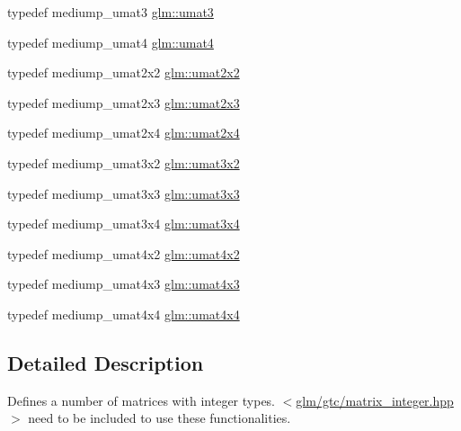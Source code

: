 \begin{DoxyCompactItemize}
\item 
typedef mediump\-\_\-umat3 \hyperlink{group__gtc__matrix__integer_ga8b8fbc858e28abf8fc344744f8d6d368}{glm\-::umat3}
\item 
typedef mediump\-\_\-umat4 \hyperlink{group__gtc__matrix__integer_ga7ae562000d8a8d193e9f93cf51e2e113}{glm\-::umat4}
\item 
typedef mediump\-\_\-umat2x2 \hyperlink{group__gtc__matrix__integer_gad3c997b31dd69bdb4787867e758ed48d}{glm\-::umat2x2}
\item 
typedef mediump\-\_\-umat2x3 \hyperlink{group__gtc__matrix__integer_ga890ae28f9230794138b2c89f44ce3376}{glm\-::umat2x3}
\item 
typedef mediump\-\_\-umat2x4 \hyperlink{group__gtc__matrix__integer_ga3b23b164240cf4dfb429776da7be9d88}{glm\-::umat2x4}
\item 
typedef mediump\-\_\-umat3x2 \hyperlink{group__gtc__matrix__integer_ga257300f2710612877ef45438a366e308}{glm\-::umat3x2}
\item 
typedef mediump\-\_\-umat3x3 \hyperlink{group__gtc__matrix__integer_gab80b6501ba1b2c40119a0f2d256f4c97}{glm\-::umat3x3}
\item 
typedef mediump\-\_\-umat3x4 \hyperlink{group__gtc__matrix__integer_ga5410857d098a989a30b4017100bc2ff7}{glm\-::umat3x4}
\item 
typedef mediump\-\_\-umat4x2 \hyperlink{group__gtc__matrix__integer_ga13e8392218e9b6e1b7f194a21b5c88bf}{glm\-::umat4x2}
\item 
typedef mediump\-\_\-umat4x3 \hyperlink{group__gtc__matrix__integer_ga08373f5588a54da1a48e5e55c7d51004}{glm\-::umat4x3}
\item 
typedef mediump\-\_\-umat4x4 \hyperlink{group__gtc__matrix__integer_gae0931b79e808fb0983848778a60eb548}{glm\-::umat4x4}
\end{DoxyCompactItemize}


\subsection{Detailed Description}
Defines a number of matrices with integer types. $<$\hyperlink{matrix__integer_8hpp}{glm/gtc/matrix\-\_\-integer.\-hpp}$>$ need to be included to use these functionalities. 

